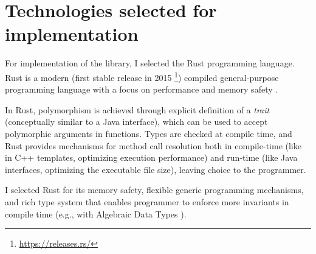 \section{Technologies selected for implementation}

For implementation of the library, I selected the Rust programming language. Rust is a modern
(first stable release in 2015 \footnote{\url{https://releases.rs/}})
compiled general-purpose programming language with a focus on performance and memory safety
\cite{klabnik2023rust}.

In Rust, polymorphism is achieved through explicit definition of a
\emph{trait} \cite{klabnik2023rust} (conceptually similar to a Java interface),
which can be used to accept polymorphic arguments in functions.
Types are checked at compile time, and Rust provides mechanisms for method call
resolution both in compile-time (like in C++ templates, optimizing execution performance)
and run-time (like Java interfaces, optimizing the executable file size),
leaving choice to the programmer.

I selected Rust for its memory safety, flexible generic programming mechanisms, and rich
type system that enables programmer to enforce more invariants in compile time (e.g., with
Algebraic Data Types \cite{klabnik2023rust}).


%
%
